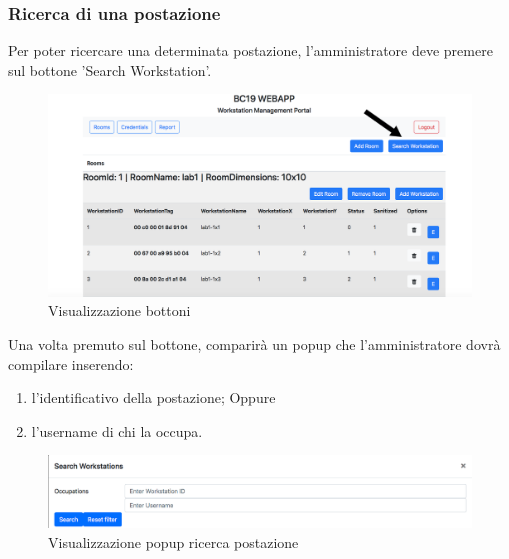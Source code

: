 \subsubsection{Ricerca di una postazione}
Per poter ricercare una determinata postazione, l'amministratore deve premere sul bottone 'Search Workstation'.
\begin{figure}[H]
	\centering
	\includegraphics[width=15cm]{res/images/bottoneSearchWorkstation.png}
	\caption{Visualizzazione bottoni}
\end{figure}
Una volta premuto sul bottone, comparirà un popup che l'amministratore dovrà compilare inserendo:
\begin{enumerate}
	\item l'identificativo della postazione;
	Oppure
	\item l'username di chi la occupa.
\end{enumerate}
\begin{figure}[H]
	\centering
	\includegraphics[width=15cm]{res/images/ricercaPostazione.png}
	\caption{Visualizzazione popup ricerca postazione}
\end{figure}

